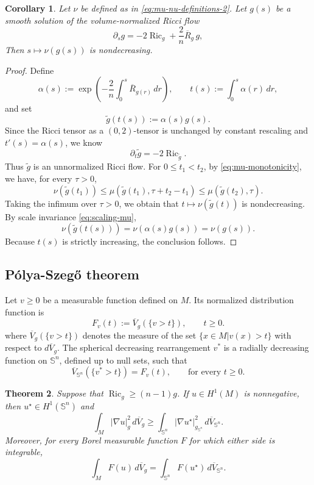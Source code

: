 \documentclass[11pt, reqno]{amsart}
\numberwithin{equation}{section}
\newtheorem{theorem}{Theorem}[section]
\newtheorem{corollary}[theorem]{Corollary}
\theoremstyle{remark}
\DeclareMathOperator{\Ric}{Ric}
\newcommand{\Sph}{\mathbb S}
\newcommand{\dbarV}[1]{d\overline V_{#1}}
\begin{document}
\begin{corollary}
\label{cor:normalized-monotonicity}
Let $\nu$ be defined as in \eqref{eq:mu-nu-definitions-2}. Let $g(s)$ be a smooth solution of the volume-normalized Ricci flow
\begin{equation}\label{eq:normalized-RF}
\partial_sg
=
-2\Ric_g+\frac{2}{n}\overline{R}_g\,g,
\end{equation}
Then $s\mapsto\nu(g(s))$ is nondecreasing.
\end{corollary}

\begin{proof}
Define
\begin{equation}\label{eq:alpha-def}
\alpha(s)
:=
\exp\left(-\frac{2}{n}\int_0^s\overline{R}_{g(r)}\,dr\right),
\qquad
 t(s):=\int_0^s\alpha(r)\,dr,
\end{equation}
and set
$$
\widetilde g(t(s)):=\alpha(s)g(s).
$$
Since the Ricci tensor as a $(0,2)$-tensor is unchanged by constant rescaling and $t'(s)=\alpha(s)$, we know
$$
\partial_t\widetilde g=-2\Ric_{\widetilde g}.
$$
Thus $\widetilde g$ is an unnormalized Ricci flow. For $0\le t_1<t_2$, by \eqref{eq:mu-monotonicity}, we have, for every $\tau>0$,
$$
\nu(\widetilde g(t_1))
\le
\mu(\widetilde g(t_1),\tau+t_2-t_1)
\le
\mu(\widetilde g(t_2),\tau).
$$
Taking the infimum over $\tau>0$, we obtain that $t\mapsto\nu(\widetilde g(t))$ is nondecreasing. By scale invariance \eqref{eq:scaling-mu},
$$
\nu(\widetilde g(t(s)))=\nu(\alpha(s)g(s))=\nu(g(s)).
$$
Because $t(s)$ is strictly increasing, the conclusion follows.
\end{proof}

\subsection{\bf P\'olya-Szeg\H{o} theorem}

Let $v\ge0$ be a measurable function defined on $M$. Its normalized distribution function is
$$
F_v(t):={\overline V}_g(\{v>t\}), \qquad t\ge0.
$$
where
${\overline V}_g(\{v>t\})$ denotes the measure of the set $\{x\in M|v(x)>t\}$ with respect to  $\dbarV g$.
The spherical decreasing rearrangement $v^*$ is a  radially decreasing function on $\mathbb S^n$, defined up to null sets, such that
\begin{equation}\label{eq:equimeasurable}
{\overline V}_{\Sph^n}(\{v^*>t\})=F_v(t),\qquad\text{for every }t\ge0.
\end{equation}
\begin{theorem}\label{thm:PolyaSzego}
Suppose that  $\Ric_g\geq(n-1)g$. If
$u\in H^1(M)$ is nonnegative, then $u^\star\in H^1(\Sph^n)$ and
\begin{equation}\label{eq:PS-energy}
\int_M|\nabla u|_g^2\,\dbarV g
\geq\int_{\Sph^n}|\nabla u^\star|_{g_{\Sph^n}}^2\,\dbarV {\Sph^n}.
\end{equation}
Moreover, for every Borel measurable function $F$ for which either side is integrable,
\begin{equation}\label{eq:PS-pushforward}
\int_MF(u)\,\dbarV g
=\int_{\Sph^n}F(u^\star)\,\dbarV {\Sph^n}.
\end{equation}
\end{theorem}
\end{document}
